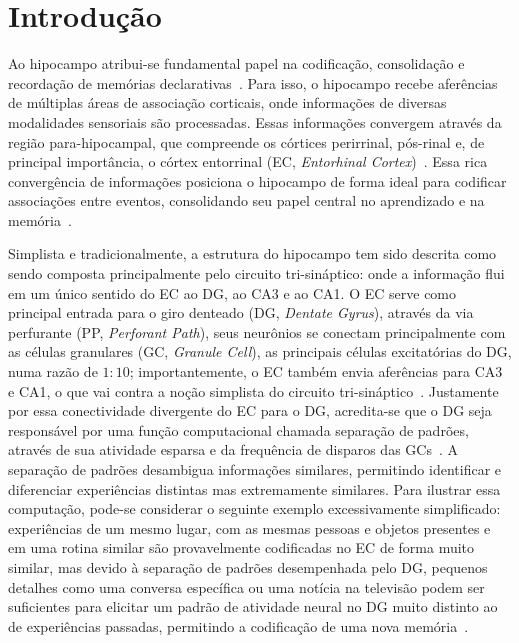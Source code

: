 \chapter{Introdução}

Ao hipocampo atribui-se fundamental papel na codificação, consolidação e recordação de memórias
declarativas~\cite{eichenbaumHippocampus1999}. Para isso, o hipocampo recebe aferências de múltiplas áreas de associação
corticais, onde informações de diversas modalidades sensoriais são processadas. Essas informações convergem através da região
para-hipocampal, que compreende os córtices perirrinal, pós-rinal e, de principal importância, o córtex entorrinal (EC,
\textit{Entorhinal Cortex})~\cite{eichenbaumCortical2000}. Essa rica convergência de informações posiciona o hipocampo de forma
ideal para codificar associações entre eventos, consolidando seu papel central no aprendizado e na memória~\cite{henkeModel2010,
berdugo-vegaSharpening2023}.

Simplista e tradicionalmente, a estrutura do hipocampo tem sido descrita como sendo composta principalmente pelo circuito
tri-sináptico: onde a informação flui em um único sentido do EC ao DG, ao CA3 e ao CA1. O EC serve como principal entrada para o
giro denteado (DG, \textit{Dentate Gyrus}), através da via perfurante (PP, \textit{Perforant Path}), seus neurônios se conectam
principalmente com as células granulares (GC, \textit{Granule Cell}), as principais células excitatórias do DG, numa razão de
$1:10$; importantemente, o EC também envia aferências para CA3 e CA1, o que vai contra a noção simplista do circuito
tri-sináptico~\cite{basuCorticohippocampal2015}. Justamente por essa conectividade divergente do EC para o DG, acredita-se que o
DG seja responsável por uma função computacional chamada separação de padrões, através de sua atividade esparsa e da frequência de
disparos das GCs~\cite{hainmuellerDentate2020, kesnerMnemonic2006, yassaPattern2011}. A separação de padrões desambigua
informações similares, permitindo identificar e diferenciar experiências distintas mas extremamente similares. Para ilustrar essa
computação, pode-se considerar o seguinte exemplo excessivamente simplificado: experiências de um mesmo lugar, com as mesmas
pessoas e objetos presentes e em uma rotina similar são provavelmente codificadas no EC de forma muito similar, mas devido à
separação de padrões desempenhada pelo DG, pequenos detalhes como uma conversa específica ou uma notícia na televisão podem ser
suficientes para elicitar um padrão de atividade neural no DG muito distinto ao de experiências passadas, permitindo a codificação
de uma nova memória~\cite{eichenbaumHippocampus2004}.

